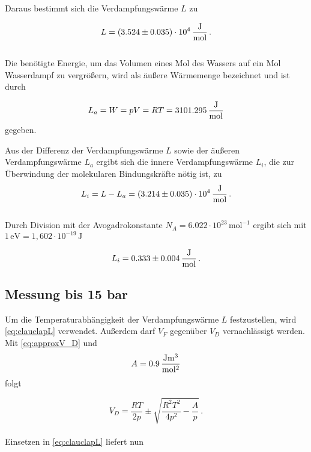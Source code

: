 Daraus bestimmt sich die Verdampfungswärme $L$ zu

\begin{equation*}
  L = (3.524 \pm 0.035) \cdot 10^4 \,\unit{\frac{\joule}{\mol}} \,.
\end{equation*} \\

Die benötigte Energie, um das Volumen eines Mol des Wassers auf ein Mol Wasserdampf zu vergrößern, wird
als äußere Wärmemenge bezeichnet und ist durch

\begin{equation}
  L_a = W = pV = RT = 3101.295 \,\unit{\frac{\joule}{\mol}}
  \label{eq:äußereVW}
\end{equation} gegeben.

Aus der Differenz der Verdampfungswärme $L$ sowie der äußeren Verdampfungswärme $L_a$ ergibt sich die
innere Verdampfungswärme $L_i$, die zur Überwindung der molekularen Bindungskräfte nötig ist, zu 
\begin{equation}
  L_i = L - L_a = (3.214 \pm 0.035) \cdot 10^4 \,\unit{\frac{\joule}{\mol}} \,.
  \label{eq:innereVW}
\end{equation} \\

Durch Division mit der Avogadrokonstante $N_A = 6.022 \cdot 10^{23} \,\unit{\mol}^{-1}$ ergibt sich
mit $1 \,\unit{\electronvolt} = 1,602 \cdot 10^{-19} \,\unit{\joule}$

\begin{equation}
  L_i = 0.333 \pm 0.004 \,\unit{\frac{\joule}{\mol}} \,.
\end{equation}

\subsection{Messung bis 15 bar}
Um die Temperaturabhängigkeit der Verdampfungswärme $L$ festzustellen, wird \eqref{eq:clauclapL} verwendet.
Außerdem darf $V_F$ gegenüber $V_D$ vernachlässigt werden.
Mit \eqref{eq:approxV_D} und 
\begin{equation*}
  A = 0.9 \,\unit{\frac{\joule\cubic\meter}{\square\mol}}
\end{equation*} folgt

\begin{equation}
  V_D = \frac{RT}{2p} \pm \sqrt{\frac{R^2 T^2}{4 p^2} - \frac{A}{p}}\,.
\end{equation} \\

Einsetzen in \eqref{eq:clauclapL} liefert nun

